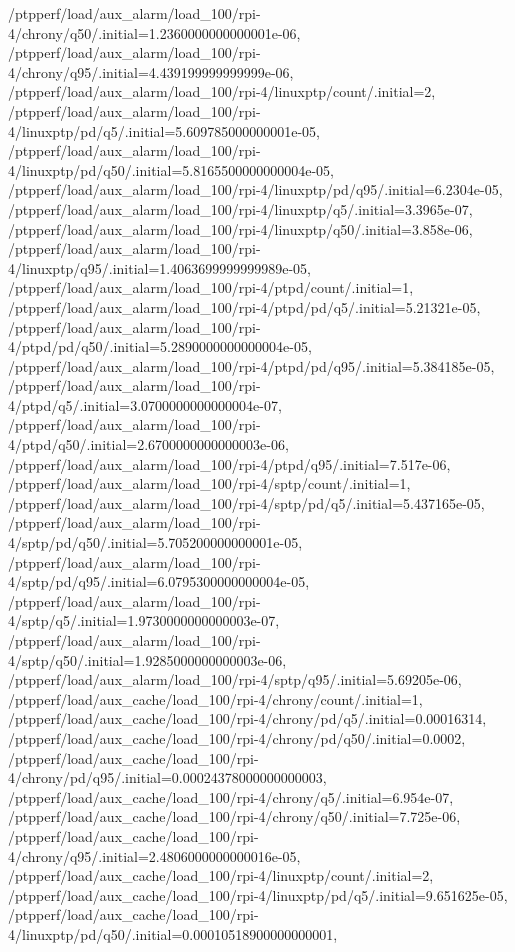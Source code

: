 {    /ptpperf/load/aux_alarm/load_100/rpi-4/chrony/q50/.initial=1.2360000000000001e-06,
    /ptpperf/load/aux_alarm/load_100/rpi-4/chrony/q95/.initial=4.439199999999999e-06,
    /ptpperf/load/aux_alarm/load_100/rpi-4/linuxptp/count/.initial=2,
    /ptpperf/load/aux_alarm/load_100/rpi-4/linuxptp/pd/q5/.initial=5.609785000000001e-05,
    /ptpperf/load/aux_alarm/load_100/rpi-4/linuxptp/pd/q50/.initial=5.8165500000000004e-05,
    /ptpperf/load/aux_alarm/load_100/rpi-4/linuxptp/pd/q95/.initial=6.2304e-05,
    /ptpperf/load/aux_alarm/load_100/rpi-4/linuxptp/q5/.initial=3.3965e-07,
    /ptpperf/load/aux_alarm/load_100/rpi-4/linuxptp/q50/.initial=3.858e-06,
    /ptpperf/load/aux_alarm/load_100/rpi-4/linuxptp/q95/.initial=1.4063699999999989e-05,
    /ptpperf/load/aux_alarm/load_100/rpi-4/ptpd/count/.initial=1,
    /ptpperf/load/aux_alarm/load_100/rpi-4/ptpd/pd/q5/.initial=5.21321e-05,
    /ptpperf/load/aux_alarm/load_100/rpi-4/ptpd/pd/q50/.initial=5.2890000000000004e-05,
    /ptpperf/load/aux_alarm/load_100/rpi-4/ptpd/pd/q95/.initial=5.384185e-05,
    /ptpperf/load/aux_alarm/load_100/rpi-4/ptpd/q5/.initial=3.0700000000000004e-07,
    /ptpperf/load/aux_alarm/load_100/rpi-4/ptpd/q50/.initial=2.6700000000000003e-06,
    /ptpperf/load/aux_alarm/load_100/rpi-4/ptpd/q95/.initial=7.517e-06,
    /ptpperf/load/aux_alarm/load_100/rpi-4/sptp/count/.initial=1,
    /ptpperf/load/aux_alarm/load_100/rpi-4/sptp/pd/q5/.initial=5.437165e-05,
    /ptpperf/load/aux_alarm/load_100/rpi-4/sptp/pd/q50/.initial=5.705200000000001e-05,
    /ptpperf/load/aux_alarm/load_100/rpi-4/sptp/pd/q95/.initial=6.0795300000000004e-05,
    /ptpperf/load/aux_alarm/load_100/rpi-4/sptp/q5/.initial=1.9730000000000003e-07,
    /ptpperf/load/aux_alarm/load_100/rpi-4/sptp/q50/.initial=1.9285000000000003e-06,
    /ptpperf/load/aux_alarm/load_100/rpi-4/sptp/q95/.initial=5.69205e-06,
    /ptpperf/load/aux_cache/load_100/rpi-4/chrony/count/.initial=1,
    /ptpperf/load/aux_cache/load_100/rpi-4/chrony/pd/q5/.initial=0.00016314,
    /ptpperf/load/aux_cache/load_100/rpi-4/chrony/pd/q50/.initial=0.0002,
    /ptpperf/load/aux_cache/load_100/rpi-4/chrony/pd/q95/.initial=0.00024378000000000003,
    /ptpperf/load/aux_cache/load_100/rpi-4/chrony/q5/.initial=6.954e-07,
    /ptpperf/load/aux_cache/load_100/rpi-4/chrony/q50/.initial=7.725e-06,
    /ptpperf/load/aux_cache/load_100/rpi-4/chrony/q95/.initial=2.4806000000000016e-05,
    /ptpperf/load/aux_cache/load_100/rpi-4/linuxptp/count/.initial=2,
    /ptpperf/load/aux_cache/load_100/rpi-4/linuxptp/pd/q5/.initial=9.651625e-05,
    /ptpperf/load/aux_cache/load_100/rpi-4/linuxptp/pd/q50/.initial=0.00010518900000000001,
}
